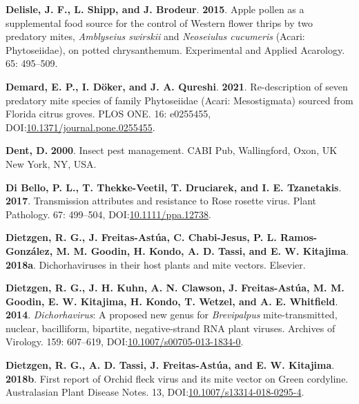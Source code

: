 \documentclass[12pt,final,CPage]{ufthesis}
\newlength{\cslhangindent}
\newenvironment{CSLReferences}[2] %
{%
	\setlength{\parindent}{0pt}
	\ifodd #1 \everypar{\setlength{\hangindent}{\cslhangindent}}\ignorespaces\fi
	\ifnum #2 > 0
	\setlength{\parskip}{#2\baselineskip}
	\fi
}%
{}
\begin{document}
{\begin{CSLReferences}{1}{0}
  \leavevmode{}%
  \textbf{Delisle, J. F., L. Shipp, and J. Brodeur}. \textbf{2015}. Apple pollen as a supplemental food source for the control of {Western flower thrips} by two predatory mites, {\emph{Amblyseius swirskii}} and {\emph{Neoseiulus cucumeris}} {({Acari}: {Phytoseiidae})}, on potted chrysanthemum. Experimental and Applied Acarology. 65: 495--509.

  \leavevmode{}%
  \textbf{Demard, E. P., I. Döker, and J. A. Qureshi}. \textbf{2021}. Re-description of seven predatory mite species of family {Phytoseiidae} ({Acari}: {Mesostigmata}) sourced from {Florida} citrus groves. {PLOS} {ONE}. 16: e0255455, DOI:\href{https://doi.org/10.1371/journal.pone.0255455}{10.1371/journal.pone.0255455}.

  \leavevmode{}%
  \textbf{Dent, D.} \textbf{2000}. Insect pest management. CABI Pub, Wallingford, Oxon, UK New York, NY, USA.

  \leavevmode{}%
  \textbf{Di Bello, P. L., T. Thekke-Veetil, T. Druciarek, and I. E. Tzanetakis}. \textbf{2017}. Transmission attributes and resistance to {Rose rosette virus}. Plant Pathology. 67: 499--504, DOI:\href{https://doi.org/10.1111/ppa.12738}{10.1111/ppa.12738}.

  \leavevmode{}%
  \textbf{Dietzgen, R. G., J. Freitas-Astúa, C. Chabi-Jesus, P. L. Ramos-González, M. M. Goodin, H. Kondo, A. D. Tassi, and E. W. Kitajima}. \textbf{2018a}. Dichorhaviruses in their host plants and mite vectors. Elsevier.

  \leavevmode{}%
  \textbf{Dietzgen, R. G., J. H. Kuhn, A. N. Clawson, J. Freitas-Astúa, M. M. Goodin, E. W. Kitajima, H. Kondo, T. Wetzel, and A. E. Whitfield}. \textbf{2014}. {\emph{Dichorhavirus}}: A proposed new genus for {\emph{Brevipalpus}} mite-transmitted, nuclear, bacilliform, bipartite, negative-strand {RNA} plant viruses. Archives of Virology. 159: 607--619, DOI:\href{https://doi.org/10.1007/s00705-013-1834-0}{10.1007/s00705-013-1834-0}.

  \leavevmode{}%
  \textbf{Dietzgen, R. G., A. D. Tassi, J. Freitas-Astúa, and E. W. Kitajima}. \textbf{2018b}. First report of {Orchid fleck virus} and its mite vector on {Green cordyline}. Australasian Plant Disease Notes. 13, DOI:\href{https://doi.org/10.1007/s13314-018-0295-4}{10.1007/s13314-018-0295-4}.


\end{CSLReferences}}
\end{document}
